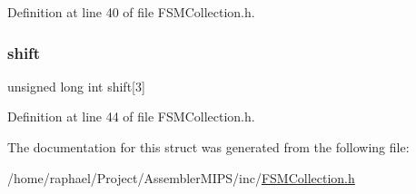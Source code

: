Definition at line 40 of file F\+S\+M\+Collection.\+h.

\mbox{\label{struct_c_o_l_l_e_c_t_i_o_n___f_s_m_a7585ec4845287803e9a17e66d0c453a4}} 
\subsubsection{\texorpdfstring{shift}{shift}}
{\footnotesize\ttfamily unsigned long int shift\mbox{[}3\mbox{]}}



Definition at line 44 of file F\+S\+M\+Collection.\+h.



The documentation for this struct was generated from the following file\+:\begin{DoxyCompactItemize}
\item 
/home/raphael/\+Project/\+Assembler\+M\+I\+P\+S/inc/\mbox{\hyperlink{_f_s_m_collection_8h}{F\+S\+M\+Collection.\+h}}\end{DoxyCompactItemize}
